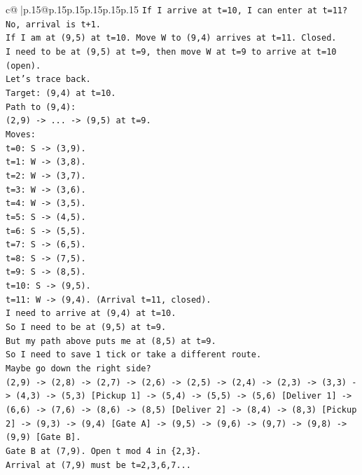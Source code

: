 \documentclass{article}
\begin{document}
{\begin{supertabular}{c@{$\;$}|p{.15\linewidth}@{}p{.15\linewidth}p{.15\linewidth}p{.15\linewidth}p{.15\linewidth}p{.15\linewidth}}
{{{\texttt{If I arrive at t=10, I can enter at t=11? No, arrival is t+1.} \\
\texttt{If I am at (9,5) at t=10. Move W to (9,4) arrives at t=11. Closed.} \\
\texttt{I need to be at (9,5) at t=9, then move W at t=9 to arrive at t=10 (open).} \\
\texttt{Let's trace back.} \\
\texttt{Target: (9,4) at t=10.} \\
\texttt{Path to (9,4):} \\
\texttt{(2,9) {-}> ... {-}> (9,5) at t=9.} \\
\texttt{Moves:} \\
\texttt{t=0: S {-}> (3,9).} \\
\texttt{t=1: W {-}> (3,8).} \\
\texttt{t=2: W {-}> (3,7).} \\
\texttt{t=3: W {-}> (3,6).} \\
\texttt{t=4: W {-}> (3,5).} \\
\texttt{t=5: S {-}> (4,5).} \\
\texttt{t=6: S {-}> (5,5).} \\
\texttt{t=7: S {-}> (6,5).} \\
\texttt{t=8: S {-}> (7,5).} \\
\texttt{t=9: S {-}> (8,5).} \\
\texttt{t=10: S {-}> (9,5).} \\
\texttt{t=11: W {-}> (9,4). (Arrival t=11, closed).} \\
\texttt{I need to arrive at (9,4) at t=10.} \\
\texttt{So I need to be at (9,5) at t=9.} \\
\texttt{But my path above puts me at (8,5) at t=9.} \\
\texttt{So I need to save 1 tick or take a different route.} \\
\texttt{Maybe go down the right side?} \\
\texttt{(2,9) {-}> (2,8) {-}> (2,7) {-}> (2,6) {-}> (2,5) {-}> (2,4) {-}> (2,3) {-}> (3,3) {-}> (4,3) {-}> (5,3) {[}Pickup 1{]} {-}> (5,4) {-}> (5,5) {-}> (5,6) {[}Deliver 1{]} {-}> (6,6) {-}> (7,6) {-}> (8,6) {-}> (8,5) {[}Deliver 2{]} {-}> (8,4) {-}> (8,3) {[}Pickup 2{]} {-}> (9,3) {-}> (9,4) {[}Gate A{]} {-}> (9,5) {-}> (9,6) {-}> (9,7) {-}> (9,8) {-}> (9,9) {[}Gate B{]}.} \\
\texttt{Gate B at (7,9). Open t mod 4 in \{2,3\}.} \\
\texttt{Arrival at (7,9) must be t=2,3,6,7...} \\
}}}
\end{supertabular}}
\end{document}
